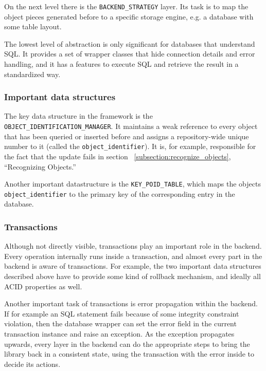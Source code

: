 On the next level there is the \lstinline!BACKEND_STRATEGY! layer.
Its task is to map the object pieces generated before to a specific storage engine, e.g. a database with some table layout.

The lowest level of abstraction is only significant for databases that understand SQL. 
It provides a set of wrapper classes that hide connection details and error handling, and it has a features to execute SQL and retrieve the result in a standardized way.

\subsubsection{Important data structures}

The key data structure in the framework is the \lstinline!OBJECT_IDENTIFICATION_MANAGER!.
It maintains a weak reference to every object that has been queried or inserted before and assigns a repository-wide unique number to it (called the \lstinline!object_identifier!).
It is, for example, responsible for the fact that the update fails in section ~\ref{subsection:recognize_objects}, ``Recognizing Objects.''

Another important datastructure is the \lstinline!KEY_POID_TABLE!, which maps the objects \lstinline!object_identifier! to the primary key of the corresponding entry in the database.

\subsubsection{Transactions}

Although not directly visible, transactions play an important role in the backend.
Every operation internally runs inside a transaction, and almost every part in the backend is aware of transactions.
For example, the two important data structures described above have to provide some kind of rollback mechanism, and ideally all ACID  properties as well.

Another important task of transactions is error propagation within the backend.
If for example an SQL statement fails because of some integrity constraint violation, then the database wrapper can set the error field in the current transaction instance and raise an exception.
As the exception propagates upwards, every layer in the backend can do the appropriate steps to bring the library back in a consistent state, using the transaction with the error inside to decide its actions.

